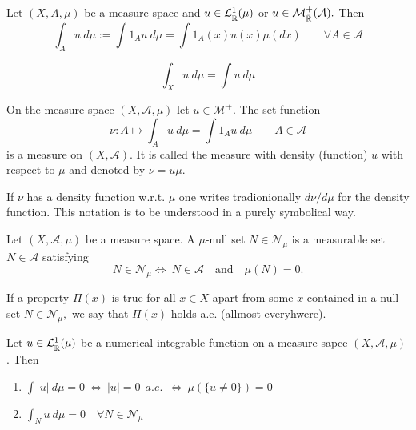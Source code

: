 \begin{defn}
Let \((X,A,\mu )\) be a measure space and \(u\in \mathcal{L}_{\bar{\Bbb{R}}}^1(\mu )\) or \(u\in \mathcal{M}_{\bar{\Bbb{R}}}^+(\mathcal{A}).\) Then
\[
\int _A u\  d\mu :=\int  1_Au\  d\mu =\int 1_A(x)u(x)\mu (dx) \qquad \forall A\in \mathcal{A}
\]
\end{defn}

\begin{prop}
\[
\int _X u\  d\mu  = \int  u\  d\mu 
\]
\end{prop}

\begin{thm}
On the measure space \((X,\mathcal{A},\mu )\) let \(u\in \mathcal{M}^+.\) The set-function
\[
\nu : A \mapsto  \int _A u\  d\mu =\int 1_A u\  d\mu  \qquad A\in \mathcal{A}
\]
is a measure on \((X,\mathcal{A}).\) It is called the measure with density (function) \(u\) with respect to \(\mu \) and denoted by \(\nu =u\mu .\)
\end{thm}

\begin{defn}
If \(\nu \) has a density function w.r.t. \(\mu \) one writes tradionionally \(d\nu /d\mu \) for the density function. This notation is to be understood in a purely symbolical way.
\end{defn}

\begin{defn}
Let \((X,\mathcal{A},\mu )\) be a measure space. A \(\mu \)-null set \(N\in \mathcal{N}_\mu \) is a measurable set \(N\in \mathcal{A}\) satisfying
\[
N\in \mathcal{N}_\mu  \Longleftrightarrow \  N\in \mathcal{A}\quad \text{and}\quad \mu (N)=0.
\]
\end{defn}

\begin{defn}
If a property \(\Pi (x)\) is true for all \(x\in X\) apart from some \(x\) contained in a null set \(N\in \mathcal{N}_\mu ,\) we say that \(\Pi (x)\) holds a.e. (allmost everyhwere).
\end{defn}

\begin{thm}
Let \(u\in \mathcal{L}_{\bar{\Bbb{R}}}^1(\mu )\) be a numerical integrable function on a measure sapce \((X,\mathcal{A},\mu )\). Then

\begin{enumerate}
  \item \(\int |u|\  d\mu =0\  \Longleftrightarrow \  |u|=0\  \  a.e.\  \  \Longleftrightarrow \  \mu (\{u\neq 0\})=0\)
  \item \(\int _N u\  d\mu =0 \quad \forall N\in \mathcal{N}_\mu \)
\end{enumerate}

\end{thm}

